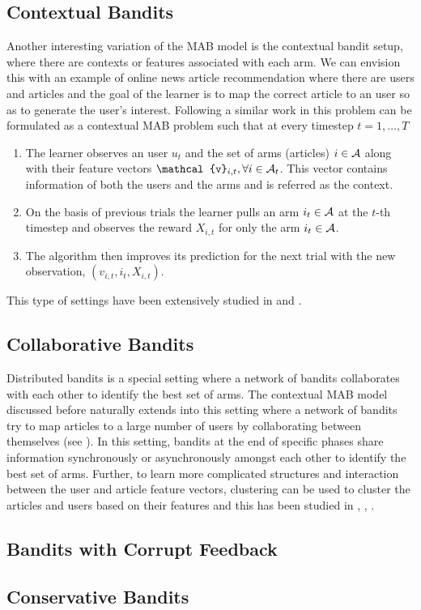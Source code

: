 \subsection{Contextual Bandits}

Another interesting variation of the MAB model is the contextual bandit setup, where there are contexts or features associated with each arm. We can envision this with an example of online news article recommendation where there are users and articles and the goal of the learner is to map the correct article to an user so as to generate the user's  interest. Following a similar work in \citet{langford2008epoch} this problem can be formulated as a contextual MAB problem such that at every timestep $t=1,\ldots,T$
\begin{enumerate}
\item The learner observes an user $u_t$ and the set of arms (articles) $i\in\mathcal{A}$ along with their feature vectors $\mathcal{v}_{i,t},\forall i\in\A_t$. This vector contains information of both the users and the arms and is referred as the context.
\item On the basis of previous trials the learner pulls an arm $i_t\in\mathcal{A}$ at the $t$-th timestep and observes the reward $X_{i,t}$ for only the arm $i_t\in\mathcal{A}$.
\item The algorithm then improves its prediction for the next trial with the new observation, $\left(v_{i,t},i_{t}, X_{i,t} \right)$.
\end{enumerate}
This type of settings have been extensively studied in \citet{li2010contextual} and \citet{beygelzimer2011contextual}.

\subsection{Collaborative Bandits}

Distributed bandits is a special setting where a network of bandits collaborates with each other to identify the best set of arms. The contextual MAB model discussed before naturally extends into this setting where a network of bandits try to map articles to a large number of users by collaborating between themselves (see \citet{awerbuch2008competitive,liu2010distributed,szorenyi2013gossip,hillel2013distributed}). In this setting, bandits at the end of specific phases share information synchronously or asynchronously amongst each other to identify the best set of arms. Further, to learn more complicated structures and interaction between the user and article feature vectors, clustering can be used to cluster the articles and users based on their features and this has been studied in \citet{bui2012clustered}, \citet{cesa2013gang}, \citet{gentile2014online}.

\subsection{Bandits with Corrupt Feedback}


\subsection{Conservative Bandits}